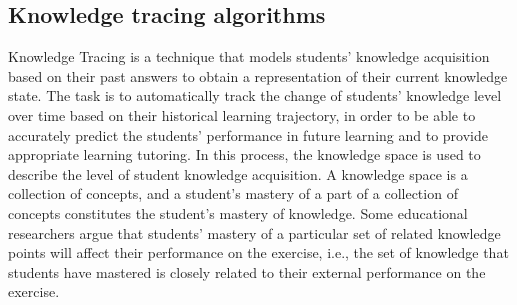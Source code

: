\subsection{Knowledge tracing algorithms}
Knowledge Tracing is a technique that models students' knowledge acquisition based on their past answers to obtain a representation of their current knowledge state. The task is to automatically track the change of students' knowledge level over time based on their historical learning trajectory, in order to be able to accurately predict the students' performance in future learning and to provide appropriate learning tutoring. In this process, the knowledge space is used to describe the level of student knowledge acquisition. A knowledge space is a collection of concepts, and a student's mastery of a part of a collection of concepts constitutes the student's mastery of knowledge. Some educational researchers argue that students' mastery of a particular set of related knowledge points will affect their performance on the exercise, i.e., the set of knowledge that students have mastered is closely related to their external performance on the exercise.


